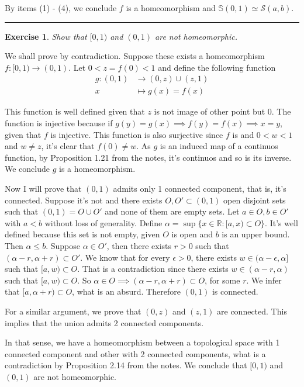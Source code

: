 \documentclass[a4paper,11pt]{article}
\newcommand{\linia}{\rule{\linewidth}{0.5pt}}
\theoremstyle{mytheor}
\theoremstyle{mytheor}
\newtheorem{exercise}{Exercise}
\theoremstyle{remark}
\newcommand{\R}{\mathbb{R}}
\begin{document}
By items (1) - (4), we conclude $f$ is a homeomorphism and $\mathbb{S}(0,1) \simeq
\mathcal{S}(a,b)$.

\noindent\linia

\begin{exercise}
    Show that $[0, 1)$ and $(0, 1)$ are not homeomorphic.
\end{exercise}

We shall prove by contradiction. Suppose these exists a homeomorphism $f :
[0,1) \to (0,1)$. Let $0 < z = f(0) < 1$ and define the following function
\begin{align*}
    g : (0,1) &\to (0,z) \cup (z,1) \\
    x &\mapsto g(x) = f(x)
\end{align*}

This function is well defined given that $z$ is not image of other point but
$0$. The function is injective because if $g(y) = g(x) \implies f(y) = f(x)
\implies x = y$, given that $f$ is injective. This function is also surjective
since $f$ is and $0 < w < 1$ and $w \neq z$, it's clear that $f(0) \neq w$. As
$g$ is an induced map of a continuos function, by Proposition 1.21 from the
notes, it's continuos and so is its inverse. We conclude $g$ is a
homeomorphism. 

Now I will prove that $(0,1)$ admits only 1 connected component, that is, it's
connected. Suppose it's not and there exists $O, O' \subset (0,1)$ open
disjoint sets such that $(0,1) = O \cup O'$ and none of them are
empty sets. Let $a \in O, b \in O'$ with $a < b$ without loss of generality.
Define $\alpha = \sup\{x \in \R : [a,x) \subset O\}$. It's well
defined because this set is not empty, given $O$ is open and $b$ is an upper
bound. Then $\alpha \leq b$. Suppose $\alpha \in O'$, then there exists $r >
0$ such that $(\alpha - r,\alpha + r) \subset O'$. We know that for every
$\epsilon > 0$, there exists $w \in (\alpha - \epsilon, \alpha]$ such that
$[a, w) \subset O$. That is a contradiction since there exists $w \in (\alpha
- r, \alpha)$ such that $[a, w) \subset O$. So $\alpha \in O \implies (\alpha
- r, \alpha + r) \subset O$, for some $r$. We infer that $[a,\alpha + r) \subset
O$, what is an absurd. Therefore $(0,1)$ is connected. 

For a similar argument, we prove that $(0,z)$ and $(z,1)$ are connected. This
implies that the union admits 2 connected components.

In that sense, we have a homeomorphism between a topological space with 1
connected component and other with 2 connected components, what is a
contradiction by Proposition 2.14 from the notes. We conclude that $[0,1)$ and
$(0,1)$ are not homeomorphic.
\end{document}
